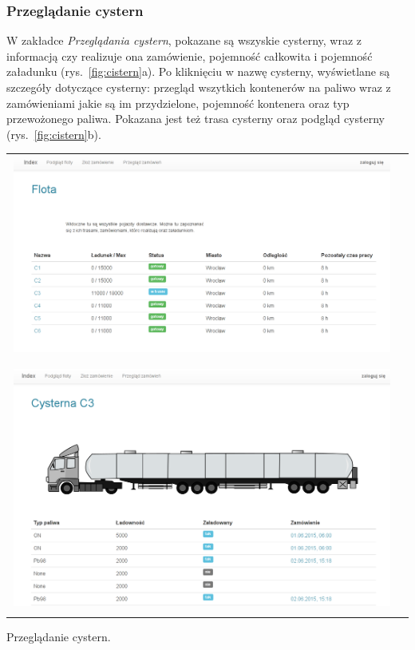 \documentclass[11pt,a4paper,oneside]{mwart}
\begin{document}
\subsubsection{Przeglądanie cystern}
W zakładce \emph{Przeglądania cystern}, pokazane są wszyskie cysterny, wraz z informacją czy realizuje ona zamówienie, pojemność całkowita i pojemność załadunku (rys.~\ref{fig:cistern}a). Po kliknięciu w nazwę cysterny, wyświetlane są szczegóły dotyczące cysterny: przegląd wszytkich kontenerów na paliwo wraz z zamówieniami jakie są im przydzielone, pojemność kontenera oraz typ przewożonego paliwa. Pokazana jest też trasa cysterny oraz podgląd cysterny (rys.~\ref{fig:cistern}b).

\begin{wykres}[htbp]
  \centering
  \begin{tabular}{cc}
    \includegraphics[width=0.99\textwidth]{pics/cistern_list.png} \\
    \raisebox{1.5ex}{a) Przeglądanie floty.} \\
    \\
    \includegraphics[width=0.99\textwidth]{pics/cistern_detail.png} \\
  \raisebox{1.5ex}{b) Szczegóły cysterny.}\\ 
\end{tabular}
  \caption{Przeglądanie cystern.}
  \label{fig:cistern}
\end{wykres}
\end{document}
